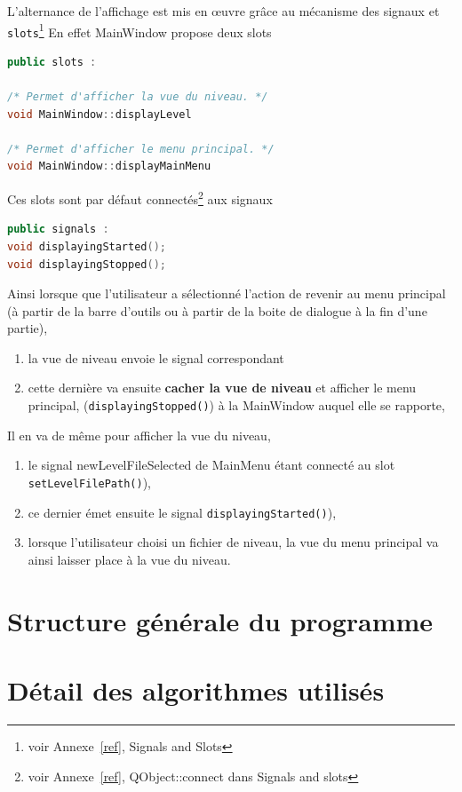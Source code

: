\documentclass[a4paper,11pt]{report}
\begin{document}
L'alternance de l'affichage est mis en œuvre grâce au mécanisme des
signaux et \texttt{slots}\footnote{voir Annexe~\ref{ref}, Signals and Slots}
En effet MainWindow propose deux slots 
\begin{lstlisting}[title=MainWindow,frame=single,language=C++]
public slots :

/* Permet d'afficher la vue du niveau. */
void MainWindow::displayLevel 

/* Permet d'afficher le menu principal. */
void MainWindow::displayMainMenu 
\end{lstlisting}
Ces slots sont par défaut connectés\footnote{voir Annexe~\ref{ref},
QObject::connect dans Signals and slots} aux signaux 
\begin{lstlisting}[title=LevelView,frame=single,language=C++]
public signals : 
void displayingStarted();
void displayingStopped();
\end{lstlisting}
Ainsi lorsque que l'utilisateur a sélectionné l'action de revenir au menu
principal (à partir de la barre d'outils ou à partir de la boite de dialogue à
la fin d'une partie), 

\begin{enumerate}
	\item la vue de niveau envoie le signal correspondant
	\item cette dernière va ensuite \textbf{cacher la vue de niveau} et afficher le menu principal,
		(\texttt{displayingStopped()}) à la MainWindow auquel elle se rapporte, 
\end{enumerate}

Il en va de même pour afficher la vue du niveau, 
\begin{enumerate}
	\item le signal newLevelFileSelected de MainMenu étant connecté au slot
		\texttt{setLevelFilePath()}),
	\item ce dernier émet ensuite le signal \texttt{displayingStarted()}), 
	\item lorsque l'utilisateur choisi un fichier de niveau, la vue du
		menu principal va ainsi laisser place à la vue du niveau.
\end{enumerate}

\chapter[Structure du programme]{Structure générale du programme}



\chapter[Algorithmes]{Détail des algorithmes utilisés}
\end{document}
